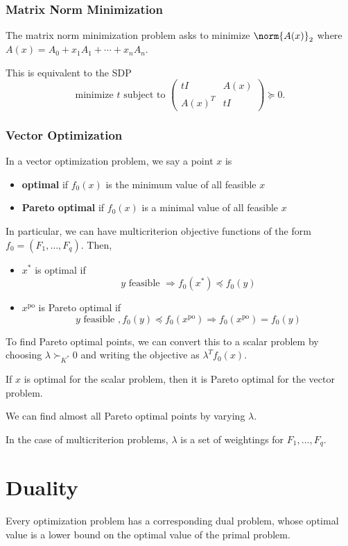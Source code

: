 \documentclass[11pt]{article}
\begin{document}
\subsubsection*{Matrix Norm Minimization}
The matrix norm minimization problem asks to minimize $\norm{A(x)}_2$ where $A(x) = A_0 + x_1A_1 + \cdots + x_nA_n$. \par

This is equivalent to the SDP 
\[ \text{minimize } t \text{ subject to } \begin{pmatrix}
    tI & A(x) \\
    A(x)^T & tI 
\end{pmatrix} \succeq 0. \]

\subsubsection*{Vector Optimization}
In a vector optimization problem, we say a point $x$ is 
\begin{itemize}
    \item \textbf{optimal} if $f_0(x)$ is the minimum value of all feasible $x$
    \item \textbf{Pareto optimal} if $f_0(x)$ is a minimal value of all feasible $x$
\end{itemize}

In particular, we can have multicriterion objective functions of the form $f_0 = (F_1, \ldots, F_q)$. Then,
\begin{itemize}
    \item $x^*$ is optimal if 
    \[ y \text{ feasible } \Rightarrow f_0(x^*) \preceq f_0(y) \] 
    \item $x^{\text{po}}$ is Pareto optimal if 
    \[ y \text{ feasible }, f_0(y) \preceq f_0(x^{\text{po}}) \Rightarrow f_0(x^{\text{po}}) = f_0(y) \] 
\end{itemize}

To find Pareto optimal points, we can convert this to a scalar problem by choosing $\lambda \succ_{K^*} 0$ and writing the objective as $\lambda^Tf_0(x)$. \par 
If $x$ is optimal for the scalar problem, then it is Pareto optimal for the vector problem. \par
We can find almost all Pareto optimal points by varying $\lambda$. \par 
In the case of multicriterion problems, $\lambda$ is a set of weightings for $F_1, \ldots, F_q$. 
\newpage 

\section{Duality} 
Every optimization problem has a corresponding dual problem, whose optimal value is a lower bound on the optimal value of the primal problem. \par
\end{document}
